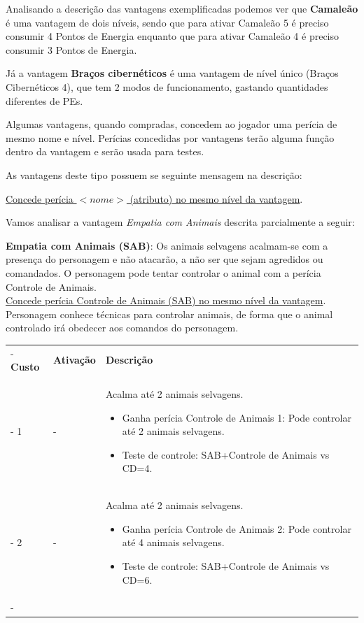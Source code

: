 Analisando a descrição das vantagens exemplificadas podemos ver que \textbf{Camaleão} é uma vantagem de dois níveis, sendo que para ativar Camaleão 5 é preciso consumir 4 Pontos de Energia enquanto que para ativar Camaleão 4 é preciso consumir 3 Pontos de Energia. 

Já a vantagem \textbf{Braços cibernéticos} é uma vantagem de nível único (Braços Cibernéticos 4), que tem 2 modos de funcionamento, gastando quantidades diferentes de PEs.

Algumas vantagens, quando compradas, concedem ao jogador uma perícia de mesmo nome e nível. Perícias concedidas por vantagens terão alguma função dentro da vantagem e serão usada para testes.

As vantagens deste tipo possuem se seguinte mensagem na descrição:
\begin{center}
	\underline{Concede perícia $<nome>$ (atributo) no mesmo nível da vantagem}.
\end{center}

Vamos analisar a vantagem \emph{Empatia com Animais} descrita parcialmente a seguir:

\begin{framed}
	\begin{minipage}[h]{.95\textwidth}
		\begin{small}
			\textbf{Empatia com Animais (SAB)}: Os animais selvagens acalmam-se com a presença do personagem e não atacarão, a não ser que sejam agredidos ou comandados. O personagem pode tentar controlar o animal com a perícia Controle de Animais. \\
			
			\underline{Concede perícia Controle de Animais (SAB) no mesmo nível da vantagem}. Personagem conhece técnicas para controlar animais, de forma que o animal controlado irá obedecer aos comandos do personagem.
			
			\begin{tabu}{|X[c]|X[c]|X[3]|} \tabucline-
				\textbf{Custo} 	& \textbf{Ativação}	&	\textbf{Descrição} \\ \tabucline-
				1	& 	-		& Acalma até 2 animais selvagens.
				\begin{itemize}
					\item Ganha perícia Controle de Animais 1: Pode controlar até 2 animais selvagens.
					\item Teste de controle: SAB+Controle de Animais vs CD=4.
				\end{itemize} \\ \tabucline-
				2	& 	-		& Acalma até 2 animais selvagens.
				\begin{itemize}
					\item Ganha perícia Controle de Animais 2: Pode controlar até 4 animais selvagens.
					\item Teste de controle: SAB+Controle de Animais vs CD=6.
				\end{itemize} \\ \tabucline-
			\end{tabu}
		\end{small}		
	\end{minipage}
\end{framed}

